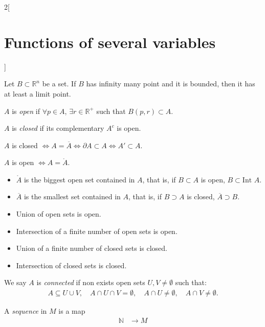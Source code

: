 \documentclass[class=article,10pt,crop=false]{standalone}
\begin{document}
\begin{multicols}{2}[\section{Functions of several variables}]
\begin{theorem}
Let $B\subset\mathbb{R}^n$ be a set. If $B$ has infinity many point and it is bounded, then it has at least a limit point.
\end{theorem}
\begin{definition}
$A$ is \textit{open} if $\forall p\in A$, $\exists r\in\mathbb{R}^+$ such that $B(p,r)\subset A$.
\end{definition}
\begin{definition}
$A$ is \textit{closed} if its complementary $A^c$ is open.
\end{definition}
\begin{prop} 
$A$ is closed $\iff A=\overline{A}\iff\partial A\subset A\iff A'\subset A$.
\end{prop}
\begin{prop} $A$ is open $\iff A=\mathring A$.
\end{prop}
\begin{prop}
\hfill
\begin{itemize}
    \item $\mathring A$ is the biggest open set contained in $A$, that is, if $B\subset A$ is open, $B\subset\text{Int }A$.
    \item $\overline{A}$ is the smallest set contained in $A$, that is, if $B\supset A$ is closed, $\overline{A}\supset B$.
\end{itemize}
\end{prop}
\begin{prop}
\hfill
\begin{itemize}
    \item Union of open sets is open.
    \item Intersection of a finite number of open sets is open.
    \item Union of a finite number of closed sets is closed.
    \item Intersection of closed sets is closed.
\end{itemize}
\end{prop}
\begin{definition}
We say $A$ is \textit{connected} if non exists open sets $U,V\ne\emptyset$ such that: 
\begin{gather*}
    A\subseteq U\cup V,\quad A\cap U\cap V=\emptyset,\quad A\cap U\ne\emptyset,\quad A\cap V\ne\emptyset.
\end{gather*}
\end{definition}
\begin{definition}
A \textit{sequence} in $M$ is a map
\begin{align*}
    \mathbb{N}&\rightarrow M\\

\end{align*}
\end{definition}
\end{multicols}
\end{document}
